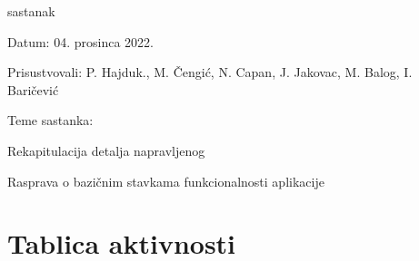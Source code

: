 \begin{packed_enum}
			\item  sastanak
			\item[] \begin{packed_item}
				\item Datum: 04. prosinca 2022.
				\item Prisustvovali: P. Hajduk., M. Čengić, N. Capan, J. Jakovac, M. Balog, I. Baričević
				\item Teme sastanka:
				\begin{packed_item}
					\item  Rekapitulacija detalja napravljenog
					\item  Rasprava o bazičnim stavkama funkcionalnosti aplikacije
				\end{packed_item}
			\end{packed_item}
			
		\end{packed_enum}
		
		\eject
		\section*{Tablica aktivnosti}
		
			

